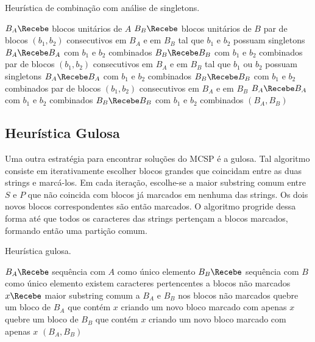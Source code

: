         \begin{algorithm}[htb]
        \caption{Heurística de combinação com análise de singletons.}
        \label{alg:combineS}

        \begin{codebox}
        \li $B_A \Recebe$ blocos unitários de $A$
        \li $B_B \Recebe$ blocos unitários de $B$
        \li \Para \Cada par de blocos $(b_1, b_2)$ consecutivos em $B_A$ e em $B_B$
        \zi tal que $b_1$ e $b_2$ possuam singletons \Faca
            \Do
        \li     $B_A \Recebe B_A$ com $b_1$ e $b_2$ combinados
        \li     $B_B \Recebe B_B$ com $b_1$ e $b_2$ combinados
            \End
        \li \Para \Cada par de blocos $(b_1, b_2)$ consecutivos em $B_A$ e em $B_B$
        \zi tal que $b_1$ ou $b_2$ possuam singletons \Faca
            \Do
        \li     $B_A \Recebe B_A$ com $b_1$ e $b_2$ combinados
        \li     $B_B \Recebe B_B$ com $b_1$ e $b_2$ combinados
            \End
        \li \Para \Cada par de blocos $(b_1, b_2)$ consecutivos em $B_A$ e em $B_B$ \Faca
            \Do
        \li     $B_A \Recebe B_A$ com $b_1$ e $b_2$ combinados
        \li     $B_B \Recebe B_B$ com $b_1$ e $b_2$ combinados
            \End
        \li \Devolva $(B_A, B_B)$
        \end{codebox}
    \end{algorithm}

\subsection{Heurística Gulosa}

    Uma outra estratégia para encontrar soluções do MCSP é a gulosa. Tal algoritmo consiste em iterativamente escolher blocos grandes que coincidam entre as duas strings e marcá-los. Em cada iteração, escolhe-se a maior substring comum entre $S$ e $P$ que não coincida com blocos já marcados em nenhuma das strings. Os dois novos blocos correspondentes são então marcados. O algoritmo progride dessa forma até que todos os caracteres das strings pertençam a blocos marcados, formando então uma partição comum.

    \begin{algorithm}[htb]
        \caption{Heurística gulosa.}
        \label{alg:greedy}

        \begin{codebox}
        \li $B_A \Recebe$ sequência com $A$ como único elemento
        \li $B_B \Recebe$ sequência com $B$ como único elemento
        \li \Enquanto existem caracteres pertencentes a blocos não marcados \Faca
            \Do
        \li     $x \Recebe$ maior substring comum a $B_A$ e $B_B$ nos blocos não marcados
        \li     quebre um bloco de $B_A$ que contém $x$ criando um novo bloco marcado com apenas $x$
        \li     quebre um bloco de $B_B$ que contém $x$ criando um novo bloco marcado com apenas $x$
            \End
        \li \Devolva $(B_A, B_B)$
        \end{codebox}
    \end{algorithm}

